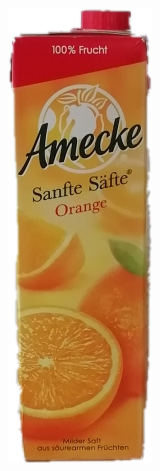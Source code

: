 \documentclass[a4paper,12pt,oneside]{article}
\begin{document}
\begin{figure}[htb]
\begin{minipage}[c]{0.08\textwidth}
\includegraphics[width=\textwidth]{Sources/Bild1.png}

\end{minipage}
\end{figure}
\end{document}
